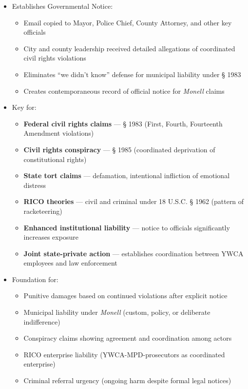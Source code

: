 \documentclass[11pt, letterpaper]{article}
\begin{document}
\begin{itemize}[leftmargin=*]
\begin{itemize}
      \item Pattern of institutional protection of abusive employees over victim safety
    \end{itemize}
  \item Establishes Governmental Notice:
    \begin{itemize}
      \item Email copied to Mayor, Police Chief, County Attorney, and other key officials
      \item City and county leadership received detailed allegations of coordinated civil rights violations
      \item Eliminates ``we didn't know'' defense for municipal liability under \S{} 1983
      \item Creates contemporaneous record of official notice for \textit{Monell} claims
    \end{itemize}
  \item Key for:
    \begin{itemize}
      \item \textbf{Federal civil rights claims} --- \S{} 1983 (First, Fourth, Fourteenth Amendment violations)
      \item \textbf{Civil rights conspiracy} --- \S{} 1985 (coordinated deprivation of constitutional rights)
      \item \textbf{State tort claims} --- defamation, intentional infliction of emotional distress
      \item \textbf{RICO theories} --- civil and criminal under 18 U.S.C. \S{} 1962 (pattern of racketeering)
      \item \textbf{Enhanced institutional liability} --- notice to officials significantly increases exposure
      \item \textbf{Joint state-private action} --- establishes coordination between YWCA employees and law enforcement
    \end{itemize}
  \item Foundation for:
    \begin{itemize}
      \item Punitive damages based on continued violations after explicit notice
      \item Municipal liability under \textit{Monell} (custom, policy, or deliberate indifference)
      \item Conspiracy claims showing agreement and coordination among actors
      \item RICO enterprise liability (YWCA-MPD-prosecutors as coordinated enterprise)
      \item Criminal referral urgency (ongoing harm despite formal legal notices)
    \end{itemize}
\end{itemize}
\end{document}
